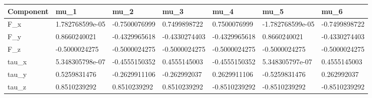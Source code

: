 \begin{tabular}{@{}lllllll@{}}
\toprule
Component & mu\_1 & mu\_2 & mu\_3 & mu\_4 & mu\_5 & mu\_6 \\
\midrule
F\_x & 1.782768599e-05 & -0.7500076999 & 0.7499898722 & 0.7500076999 & -1.782768599e-05 & -0.7499898722 \\
F\_y & 0.8660240021 & -0.4329965618 & -0.4330274403 & -0.4329965618 & 0.8660240021 & -0.4330274403 \\
F\_z & -0.5000024275 & -0.5000024275 & -0.5000024275 & -0.5000024275 & -0.5000024275 & -0.5000024275 \\
tau\_x & 5.348305798e-07 & -0.4555150352 & 0.4555145003 & -0.4555150352 & 5.348305797e-07 & 0.4555145003 \\
tau\_y & 0.5259831476 & -0.2629911106 & -0.262992037 & 0.2629911106 & -0.5259831476 & 0.262992037 \\
tau\_z & 0.8510239292 & 0.8510239292 & 0.8510239292 & -0.8510239292 & -0.8510239292 & -0.8510239292 \\
\bottomrule
\end{tabular}
